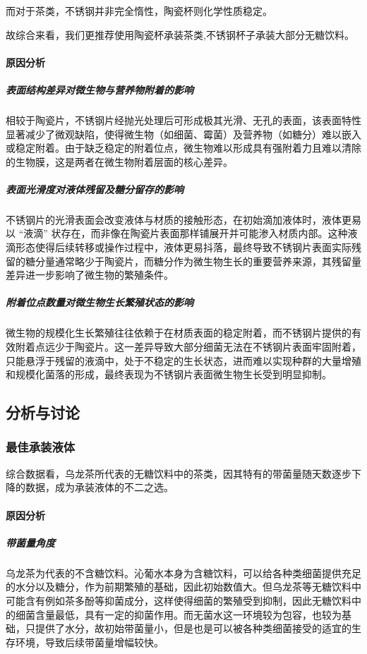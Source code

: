 \documentclass[12pt,a4paper]{ctexart}
\begin{document}
而对于茶类，不锈钢并非完全惰性，陶瓷杯则化学性质稳定。

故综合来看，我们更推荐使用陶瓷杯承装茶类,不锈钢杯子承装大部分无糖饮料。

\paragraph{原因分析}
\subparagraph{表面结构差异对微生物与营养物附着的影响}
相较于陶瓷片，不锈钢片经抛光处理后可形成极其光滑、无孔的表面，该表面特性显著减少了微观缺陷，使得微生物（如细菌、霉菌）及营养物（如糖分）难以嵌入或稳定附着。由于缺乏稳定的附着位点，微生物难以形成具有强附着力且难以清除的生物膜，这是两者在微生物附着层面的核心差异。
\subparagraph{表面光滑度对液体残留及糖分留存的影响}
不锈钢片的光滑表面会改变液体与材质的接触形态，在初始滴加液体时，液体更易以 “液滴” 状存在，而非像在陶瓷片表面那样铺展开并可能渗入材质内部。这种液滴形态使得后续转移或操作过程中，液体更易抖落，最终导致不锈钢片表面实际残留的糖分量通常略少于陶瓷片，而糖分作为微生物生长的重要营养来源，其残留量差异进一步影响了微生物的繁殖条件。
\subparagraph{附着位点数量对微生物生长繁殖状态的影响}
微生物的规模化生长繁殖往往依赖于在材质表面的稳定附着，而不锈钢片提供的有效附着点远少于陶瓷片。这一差异导致大部分细菌无法在不锈钢片表面牢固附着，只能悬浮于残留的液滴中，处于不稳定的生长状态，进而难以实现种群的大量增殖和规模化菌落的形成，最终表现为不锈钢片表面微生物生长受到明显抑制。

\subsection{分析与讨论}
\subsubsection{最佳承装液体}
综合数据看，乌龙茶所代表的无糖饮料中的茶类，因其特有的带菌量随天数逐步下降的数据，成为承装液体的不二之选。

\paragraph{原因分析}
\subparagraph{带菌量角度}
乌龙茶为代表的不含糖饮料。沁葡水本身为含糖饮料，可以给各种类细菌提供充足的水分以及糖分，作为前期繁殖的基础，因此初始数值大。但乌龙茶等无糖饮料中可能含有例如茶多酚等抑菌成分，这样使得细菌的繁殖受到抑制，因此无糖饮料中的细菌含量最低，具有一定的抑菌作用。而无菌水这一环境较为包容，也较为基础，只提供了水分，故初始带菌量小，但是也是可以被各种类细菌接受的适宜的生存环境，导致后续带菌量增幅较快。
\end{document}
